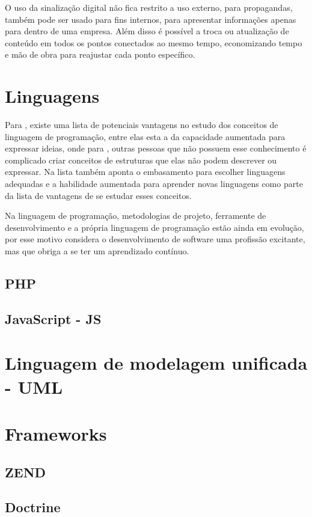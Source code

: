 O uso da sinalização digital não fica restrito a uso externo, para propagandas, também pode ser usado para fins internos, para apresentar informações apenas para dentro de uma empresa. Além disso é possível a troca ou atualização de conteúdo em todos os pontos conectados ao mesmo tempo, economizando tempo e mão de obra para reajustar cada ponto específico.

\section{Linguagens}
Para \cite{sebesta2011}, existe uma lista de potenciais vantagens no estudo dos conceitos de linguagem de programação, entre elas esta a da capacidade aumentada para expressar ideias, onde para \cite{sebesta2011}, outras pessoas que não possuem esse conhecimento é complicado criar conceitos de estruturas que elas não podem descrever ou expressar. Na lista também aponta o embasamento para escolher linguagens adequadas e a habilidade aumentada para aprender novas linguagens como parte da lista de vantagens de se estudar esses conceitos.

Na linguagem de programação, metodologias de projeto, ferramente de desenvolvimento e a própria linguagem de programação estão ainda em evolução, por esse motivo \cite{sebesta2011} considera o desenvolvimento de software uma profissão excitante, mas que obriga a se ter um aprendizado contínuo.

\subsection{PHP}
\subsection{JavaScript - JS}

\section{ Linguagem de modelagem unificada - UML}

\section{Frameworks}
\subsection{ZEND}
\subsection{Doctrine}
